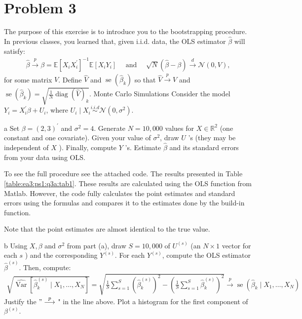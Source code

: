 \documentclass{article}
\begin{document}
\section*{Problem 3}
The purpose of this exercise is to introduce you to the bootstrapping procedure. In previous classes, you learned that, given i.i.d. data, the OLS estimator $\hat{\beta}$ will satisfy:
\begin{align*}
\hat{\beta} \stackrel{p}{\rightarrow} \beta=\mathbb{E}\left[X_{i} X_{i}^{\prime}\right]^{-1} \mathbb{E}\left[X_{i} Y_{i}\right] \quad \text { and } \quad \sqrt{N}(\hat{\beta}-\beta) \stackrel{d}{\rightarrow} \mathcal{N}(0, V),
\end{align*}
for some matrix $V$. Define $\hat{V}$ and $\operatorname{se}\left(\hat{\beta}_{k}\right)$ so that $\hat{V} \stackrel{p}{\rightarrow} V$ and $\operatorname{se}\left(\hat{\beta}_{k}\right)=\sqrt{\frac{1}{N} \operatorname{diag}(\hat{V})_{k}}$.
Monte Carlo Simulations
Consider the model $Y_{i}=X_{i}^{\prime} \beta+U_{i}$, where $U_{i} \mid X_{i} \stackrel{i . i . d}{\sim} \mathcal{N}\left(0, \sigma^{2}\right)$.
\begin{problem}{a}
Set $\beta=(2,3)^{\prime}$ and $\sigma^{2}=4$. Generate $N=10,000$ values for $X \in \mathbb{R}^{2}$ (one constant and one covariate). Given your value of $\sigma^{2}$, draw $U$ 's (they may be independent of $X$ ). Finally, compute $Y$ 's. Estimate $\hat{\beta}$ and its standard errors from your data using OLS.
\end{problem}
\begin{solution}
To see the full procedure see the attached code. The results presented in Table \ref{table:ea3:ps1:q3a:tab1}. These results are calculated using the OLS function from Matlab. However, the code fully calculates the point estimates and standard errors using the formulas and compares it to the estimates done by the build-in function. 

Note that the point estimates are almost identical to the true value. 
\end{solution}
\FloatBarrier
\begin{problem}{b}
Using $X, \beta$ and $\sigma^{2}$ from part (a), draw $S=10,000$ of $U^{(s)}$ (an $N \times 1$ vector for each $s$ ) and the corresponding $Y^{(s)}$. For each $Y^{(s)}$, compute the OLS estimator $\hat{\beta}^{(s)}$. Then, compute:
    \begin{align*}
        \sqrt{\widehat{\operatorname{Var}}\left[\hat{\beta}_{k}^{(s)} \mid X_{1}, \ldots, X_{N}\right]}=\sqrt{\frac{1}{S} \sum_{s=1}^{S}\left(\hat{\beta}_{k}^{(s)}\right)^{2}-\left(\frac{1}{S} \sum_{s=1}^{S} \hat{\beta}_{k}^{(s)}\right)^{2}} \stackrel{p}{\longrightarrow} \operatorname{se}\left(\hat{\beta}_{k} \mid X_{1}, \ldots, X_{N}\right)
    \end{align*}
    Justify the $" \stackrel{p}{\longrightarrow}$ " in the line above. Plot a histogram for the first component of $\beta^{(s)}$.
\end{problem}
\end{document}
